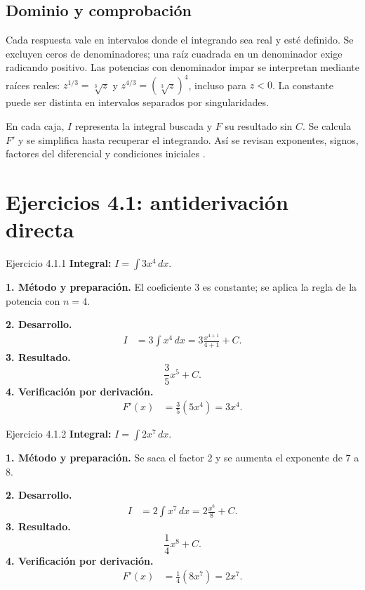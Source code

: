 \subsection{Dominio y comprobación}
Cada respuesta vale en intervalos donde el integrando sea real y esté definido. Se excluyen ceros de denominadores; una raíz cuadrada en un denominador exige radicando positivo. Las potencias con denominador impar se interpretan mediante raíces reales: $z^{1/3}=\sqrt[3]{z}$ y $z^{4/3}=(\sqrt[3]{z})^4$, incluso para $z<0$. La constante puede ser distinta en intervalos separados por singularidades.

En cada caja, $I$ representa la integral buscada y $F$ su resultado sin $C$. Se calcula $F'$ y se simplifica hasta recuperar el integrando. Así se revisan exponentes, signos, factores del diferencial y condiciones iniciales \citep{thomas2018calculus}.

\section{Ejercicios 4.1: antiderivación directa}

\begin{examplebox}{Ejercicio 4.1.1}
\textbf{Integral:} $\displaystyle I=\int 3x^4\,dx$.

\textbf{1. Método y preparación.} El coeficiente $3$ es constante; se aplica la regla de la potencia con $n=4$.

\textbf{2. Desarrollo.}
\begin{align*}
I&=3\int x^4\,dx=3\frac{x^{4+1}}{4+1}+C.
\end{align*}
\textbf{3. Resultado.}
\[
\frac35x^5+C.
\]
\textbf{4. Verificación por derivación.}
\begin{align*}
F'(x)&=\frac35(5x^4)=3x^4.
\end{align*}
\end{examplebox}

\begin{examplebox}{Ejercicio 4.1.2}
\textbf{Integral:} $\displaystyle I=\int 2x^7\,dx$.

\textbf{1. Método y preparación.} Se saca el factor $2$ y se aumenta el exponente de $7$ a $8$.

\textbf{2. Desarrollo.}
\begin{align*}
I&=2\int x^7\,dx=2\frac{x^8}{8}+C.
\end{align*}
\textbf{3. Resultado.}
\[
\frac14x^8+C.
\]
\textbf{4. Verificación por derivación.}
\begin{align*}
F'(x)&=\frac14(8x^7)=2x^7.
\end{align*}
\end{examplebox}

